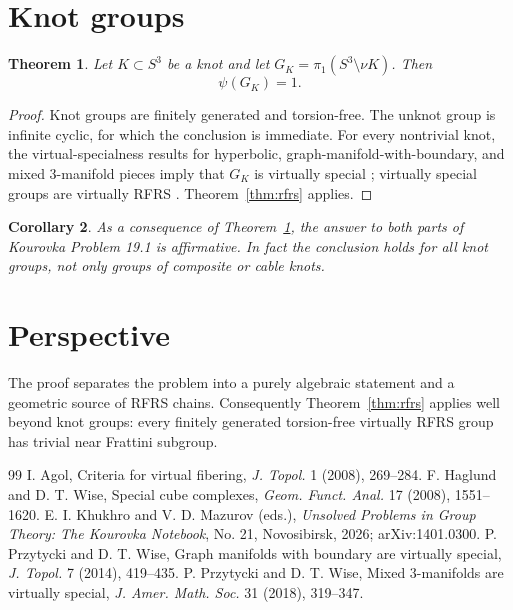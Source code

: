 \documentclass[11pt]{amsart}
\newtheorem{theorem}{Theorem}[section]
\newtheorem{corollary}[theorem]{Corollary}
\begin{document}
\section{Knot groups}
\begin{theorem}\label{thm:knot}
Let $K\subset S^3$ be a knot and let $G_K=\pi_1(S^3\setminus\nu K)$.  Then
\[
 \psi(G_K)=1.
\]
\end{theorem}
\begin{proof}
Knot groups are finitely generated and torsion-free.  The unknot group is infinite cyclic, for which the conclusion is immediate.  For every nontrivial knot, the virtual-specialness results for hyperbolic, graph-manifold-with-boundary, and mixed $3$-manifold pieces imply that $G_K$ is virtually special \cite{haglundwise,pwgraph,pwmixed}; virtually special groups are virtually RFRS \cite{agol}.  Theorem~\ref{thm:rfrs} applies.
\end{proof}

\begin{corollary}\label{cor:kourovka}
As a consequence of Theorem~\ref{thm:knot}, the answer to both parts of Kourovka Problem 19.1 is affirmative.  In fact the conclusion holds for all knot groups, not only groups of composite or cable knots.
\end{corollary}

\section{Perspective}
The proof separates the problem into a purely algebraic statement and a geometric source of RFRS chains.  Consequently Theorem~\ref{thm:rfrs} applies well beyond knot groups: every finitely generated torsion-free virtually RFRS group has trivial near Frattini subgroup.

\begin{thebibliography}{99}
 I. Agol, Criteria for virtual fibering, \emph{J. Topol.} 1 (2008), 269--284.
 F. Haglund and D. T. Wise, Special cube complexes, \emph{Geom. Funct. Anal.} 17 (2008), 1551--1620.
 E. I. Khukhro and V. D. Mazurov (eds.), \emph{Unsolved Problems in Group Theory: The Kourovka Notebook}, No. 21, Novosibirsk, 2026; arXiv:1401.0300.
 P. Przytycki and D. T. Wise, Graph manifolds with boundary are virtually special, \emph{J. Topol.} 7 (2014), 419--435.
 P. Przytycki and D. T. Wise, Mixed $3$-manifolds are virtually special, \emph{J. Amer. Math. Soc.} 31 (2018), 319--347.
\end{thebibliography}
\end{document}
